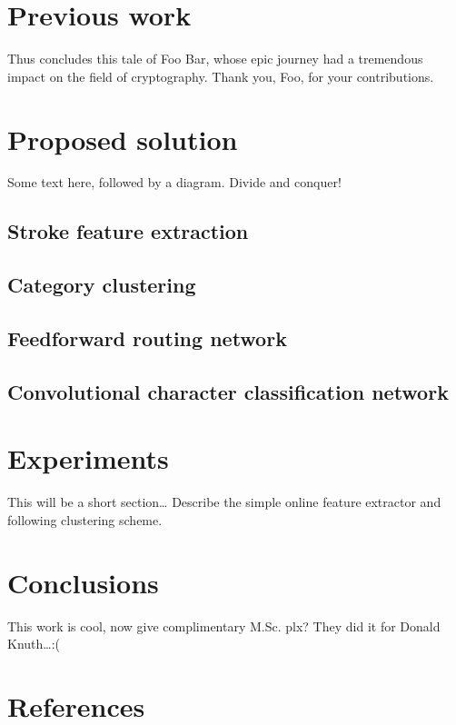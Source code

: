 \documentclass[10pt,conference,a4paper]{IEEEtran}
\begin{document}
	 


	\section{Previous work}

	Thus concludes this tale of Foo Bar, whose epic journey had a tremendous
	impact on the field of cryptography. Thank you, Foo, for your contributions.


	\section{Proposed solution}

	Some text here, followed by a diagram. Divide and conquer!


	\subsection{Stroke feature extraction}

	\subsection{Category clustering}

	\subsection{Feedforward routing network}

	\subsection{Convolutional character classification network}


	\section{Experiments}

	This will be a short section\ldots
	Describe the simple online feature extractor and following clustering scheme.


	\section{Conclusions}

	This work is cool, now give complimentary M.Sc. plx?
	They did it for Donald Knuth\ldots :(


	\section{References}
\end{document}
